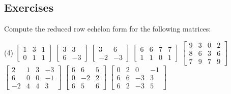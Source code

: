 \subsection{Exercises}

\begin{samepage}
\begin{exercise}
Compute the reduced row echelon form for the following matrices:
\begin{tasks}(4)
\task
$\begin{bmatrix}
1 & 3 & 1 \\
0 & 1 & 1
\end{bmatrix}$
\task
$\begin{bmatrix}
3 & 3 \\
6 & -3
\end{bmatrix}$
\task
$\begin{bmatrix}
3 & 6 \\
-2 & -3
\end{bmatrix}$
\task
$\begin{bmatrix}
6 & 6 & 7 & 7 \\
1 & 1 & 0 & 1
\end{bmatrix}$
\task
$\begin{bmatrix}
9 & 3 & 0 & 2 \\
8 & 6 & 3 & 6 \\
7 & 9 & 7 & 9
\end{bmatrix}$
\task
$\begin{bmatrix}
2 & 1 & 3 & -3 \\
6 & 0 & 0 & -1 \\
-2 & 4 & 4 & 3
\end{bmatrix}$
\task
$\begin{bmatrix}
6 & 6 & 5 \\
0 & -2 & 2 \\
6 & 5 & 6
\end{bmatrix}$
\task
$\begin{bmatrix}
0 & 2 & 0 & -1 \\
6 & 6 & -3 & 3 \\
6 & 2 & -3 & 5
\end{bmatrix}$
\end{tasks}
\end{exercise}
\end{samepage}
\comboSol{%
}
